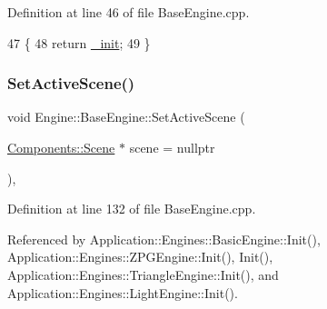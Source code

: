 Definition at line 46 of file Base\+Engine.\+cpp.


\begin{DoxyCode}
47 \{
48     \textcolor{keywordflow}{return} \mbox{\hyperlink{classEngine_1_1BaseEngine_a79e265845b321c0e9822fb170c564e55}{\_init}};
49 \}
\end{DoxyCode}
\mbox{\label{classEngine_1_1BaseEngine_afc82c6a00d5a9d4714740fc5eab5db86}} 
\subsubsection{\texorpdfstring{Set\+Active\+Scene()}{SetActiveScene()}}
{\footnotesize\ttfamily void Engine\+::\+Base\+Engine\+::\+Set\+Active\+Scene (\begin{DoxyParamCaption}\item[{\mbox{\hyperlink{classEngine_1_1Components_1_1Scene}{Components\+::\+Scene}} $\ast$}]{scene = {\ttfamily nullptr} }\end{DoxyParamCaption})\hspace{0.3cm}{\ttfamily [virtual]}, {\ttfamily [inherited]}}



Definition at line 132 of file Base\+Engine.\+cpp.



Referenced by Application\+::\+Engines\+::\+Basic\+Engine\+::\+Init(), Application\+::\+Engines\+::\+Z\+P\+G\+Engine\+::\+Init(), Init(), Application\+::\+Engines\+::\+Triangle\+Engine\+::\+Init(), and Application\+::\+Engines\+::\+Light\+Engine\+::\+Init().


